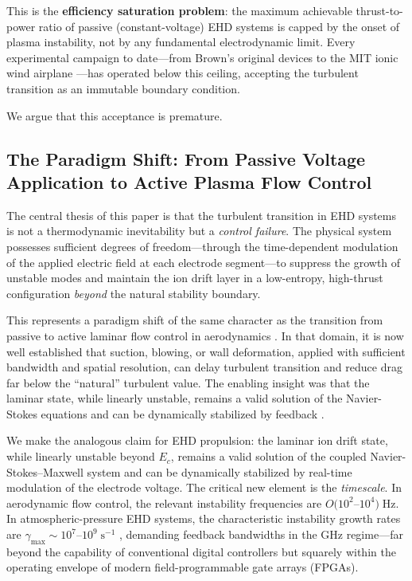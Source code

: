 \documentclass[12pt,twocolumn]{article}
\begin{document}
This is the \textbf{efficiency saturation problem}: the maximum
achievable thrust-to-power ratio of passive (constant-voltage) EHD
systems is capped by the onset of plasma instability, not by any
fundamental electrodynamic limit. Every experimental campaign to
date---from Brown's original devices to the MIT ionic wind airplane
\cite{Xu2018}---has operated below this ceiling, accepting the
turbulent transition as an immutable boundary condition.

We argue that this acceptance is premature.

\subsection{The Paradigm Shift: From Passive Voltage Application to
  Active Plasma Flow Control}
\label{sec:intro:paradigm}

The central thesis of this paper is that the turbulent transition
in EHD systems is not a thermodynamic inevitability but a
\emph{control failure}. The physical system possesses sufficient
degrees of freedom---through the time-dependent modulation of the
applied electric field at each electrode segment---to suppress the
growth of unstable modes and maintain the ion drift layer in a
low-entropy, high-thrust configuration \emph{beyond} the natural
stability boundary.

This represents a paradigm shift of the same character as the
transition from passive to active laminar flow control in
aerodynamics \cite{Gad-el-Hak2000, Bewley2001}. In that domain,
it is now well established that suction, blowing, or wall deformation,
applied with sufficient bandwidth and spatial resolution, can
delay turbulent transition and reduce drag far below the ``natural''
turbulent value. The enabling insight was that the laminar state,
while linearly unstable, remains a valid solution of the
Navier-Stokes equations and can be dynamically stabilized by
feedback \cite{Kim2003}.

We make the analogous claim for EHD propulsion: the laminar ion
drift state, while linearly unstable beyond $E_c$, remains a valid
solution of the coupled Navier-Stokes--Maxwell system and can be
dynamically stabilized by real-time modulation of the electrode
voltage. The critical new element is the \emph{timescale}. In
aerodynamic flow control, the relevant instability frequencies are
$O(10^2$--$10^4)\;\mathrm{Hz}$. In atmospheric-pressure EHD
systems, the characteristic instability growth rates are
$\gamma_{\max} \sim 10^7$--$10^9\;\mathrm{s}^{-1}$
\cite{Starikovskiy2013, Adamovich2017}, demanding feedback
bandwidths in the GHz regime---far beyond the capability of
conventional digital controllers but squarely within the operating
envelope of modern field-programmable gate arrays (FPGAs).
\end{document}
